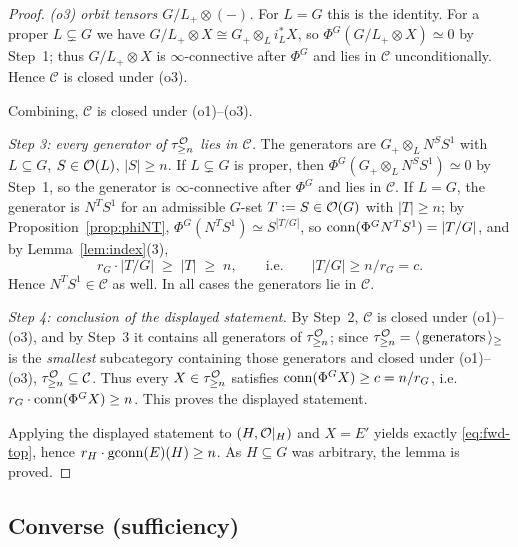 \begin{proof}
\emph{(o3) orbit tensors $G/L_+\otimes(-)$.} For $L=G$ this is the identity. For a
proper $L\subsetneq G$ we have $G/L_+\otimes X\cong G_+\otimes_L i_L^\ast X$, so
$\Phi^G(G/L_+\otimes X)\simeq 0$ by Step~1; thus $G/L_+\otimes X$ is
$\infty$-connective after $\Phi^G$ and lies in $\mathcal C$ unconditionally. Hence
$\mathcal C$ is closed under (o3).

Combining, $\mathcal C$ is closed under (o1)--(o3).

\emph{Step 3: every generator of $\tau^{\mathcal{O}}_{\ge n}$ lies in $\mathcal C$.}
The generators are $G_+\otimes_L N^S S^1$ with $L\subseteq G$, $S\in\mathcal{O}(L)$,
$|S|\ge n$. If $L\subsetneq G$ is proper, then $\Phi^G(G_+\otimes_L N^S S^1)\simeq 0$
by Step~1, so the generator is $\infty$-connective after $\Phi^G$ and lies in
$\mathcal C$. If $L=G$, the generator is $N^T S^1$ for an admissible $G$-set
$T:=S\in\mathcal{O}(G)$ with $|T|\ge n$; by Proposition~\ref{prop:phiNT},
$\Phi^G(N^T S^1)\simeq S^{|T/G|}$, so $\operatorname{conn}(\Phi^G N^T S^1)=|T/G|$, and by
Lemma~\ref{lem:index}(3),
\[
r_G\cdot|T/G|\;\ge\;|T|\;\ge\;n,\qquad\text{i.e.}\qquad |T/G|\ge n/r_G=c .
\]
Hence $N^T S^1\in\mathcal C$ as well. In all cases the generators lie in
$\mathcal C$.

\emph{Step 4: conclusion of the displayed statement.}
By Step~2, $\mathcal C$ is closed under (o1)--(o3), and by Step~3 it contains all generators of
$\tau^{\mathcal{O}}_{\ge n}$; since $\tau^{\mathcal{O}}_{\ge n}=\langle\,\text{generators}\,\rangle_{\ge}$ is the \emph{smallest}
subcategory containing those generators and closed under (o1)--(o3), $\tau^{\mathcal{O}}_{\ge n}\subseteq\mathcal C$.
Thus every $X\in\tau^{\mathcal{O}}_{\ge n}$ satisfies $\operatorname{conn}(\Phi^G X)\ge c=n/r_G$,
i.e.\ $r_G\cdot\operatorname{conn}(\Phi^G X)\ge n$. This proves the displayed statement.

Applying the displayed statement to $(H,\mathcal{O}|_H)$ and $X=E'$ yields exactly
\eqref{eq:fwd-top}, hence $r_H\cdot\operatorname{gconn}(E)(H)\ge n$. As $H\subseteq G$ was
arbitrary, the lemma is proved.
\end{proof}

\subsection*{Converse (sufficiency)}

